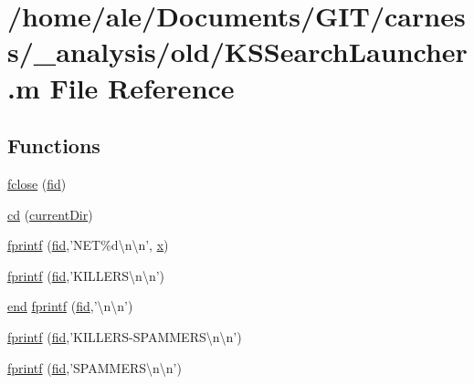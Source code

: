\hypertarget{a00025}{\section{/home/ale/\-Documents/\-G\-I\-T/carness/\-\_\-analysis/old/\-K\-S\-Search\-Launcher.m File Reference}
\label{a00025}
}
\subsection*{Functions}
\begin{DoxyCompactItemize}
\item 
\hyperlink{a00025_a5e769bbbabcaddc548203741c7100228}{fclose} (\hyperlink{a00025_ae9011d40c6f13e68e6f07156e0da7c5d}{fid})
\item 
\hyperlink{a00025_a4241e59001a956990321a269c236c993}{cd} (\hyperlink{a00025_af32eb97339f1e9d37b5540de2cbc79c9}{current\-Dir})
\item 
\hyperlink{a00025_a21172d88d238291f06b91067ea53f814}{fprintf} (\hyperlink{a00025_ae9011d40c6f13e68e6f07156e0da7c5d}{fid},'N\-E\-T\%d\textbackslash{}n\textbackslash{}n', \hyperlink{a00025_a7265972fe485274cfff77a9bb07b8fce}{x})
\item 
\hyperlink{a00025_a2bff3632fad7bca512140377cbce79ef}{fprintf} (\hyperlink{a00025_ae9011d40c6f13e68e6f07156e0da7c5d}{fid},'K\-I\-L\-L\-E\-R\-S\textbackslash{}n\textbackslash{}n')
\item 
\hyperlink{a00019_afb358f48b1646c750fb9da6c6585be2b}{end} \hyperlink{a00025_a0921b3966bd3417e73b391d1e3d61c72}{fprintf} (\hyperlink{a00025_ae9011d40c6f13e68e6f07156e0da7c5d}{fid},'\textbackslash{}n\textbackslash{}n')
\item 
\hyperlink{a00025_a4b2068e6157d1e5aeba754398e689fec}{fprintf} (\hyperlink{a00025_ae9011d40c6f13e68e6f07156e0da7c5d}{fid},'K\-I\-L\-L\-E\-R\-S-\/S\-P\-A\-M\-M\-E\-R\-S\textbackslash{}n\textbackslash{}n')
\item 
\hyperlink{a00025_a194b6c53d0062802894434f7555c8e40}{fprintf} (\hyperlink{a00025_ae9011d40c6f13e68e6f07156e0da7c5d}{fid},'S\-P\-A\-M\-M\-E\-R\-S\textbackslash{}n\textbackslash{}n')
\end{DoxyCompactItemize}
